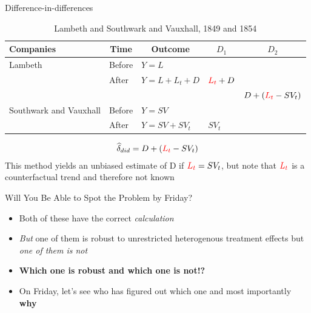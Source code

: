 \documentclass{beamer}
\begin{document}
\begin{frame}{Difference-in-differences}

\begin{table}\centering
\scriptsize
		\caption{Lambeth and Southwark and Vauxhall, 1849 and 1854}
		\begin{center}
		\begin{tabular}{lll|lc}
		\toprule
		\multicolumn{1}{l}{\textbf{Companies}}&
		\multicolumn{1}{c}{\textbf{Time}}&
		\multicolumn{1}{c}{\textbf{Outcome}}&
		\multicolumn{1}{c}{$D_1$}&
		\multicolumn{1}{c}{$D_2$}\\
		\midrule
		Lambeth & Before & $Y=L$ \\
		& After & $Y=L + L_t + D$ & $\textcolor{red}{L_t}+D$\\
		\midrule
		& & & & $D + (\textcolor{red}{L_t}- SV_t)$ \\
		\midrule
		Southwark and Vauxhall & Before & $Y=SV$ \\
		& After & $Y=SV + SV_t$ & $SV_t$\\
		\bottomrule
		\end{tabular}
		\end{center}
	\end{table}

\begin{eqnarray*}
\widehat{\delta}_{did} = D + (\textcolor{red}{L_t}- SV_t)
\end{eqnarray*}This method yields an unbiased estimate of D if $\textcolor{red}{L_t} = SV_t$, but note that $\textcolor{red}{L_t}$ is a counterfactual trend and therefore not known

\end{frame}

\begin{frame}{Will You Be Able to Spot the Problem by Friday?}

\begin{itemize}
\item Both of these have the correct \emph{calculation}
\item \emph{But} one of them is robust to unrestricted heterogenous treatment effects but \emph{one of them is not}
\item \textbf{Which one is robust and which one is not!?}
\item On Friday, let's see who has figured out which one and most importantly \textbf{why}
\end{itemize}

\end{frame}
\end{document}
